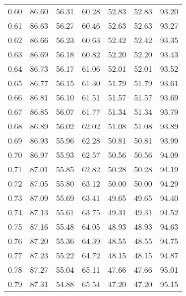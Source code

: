 \begin{tabular}{|c|c|c|c|c|c|c|}
      0.60 &     86.60 &     56.31 &      60.28 &   52.83 &      52.83 &         93.20 \\
      0.61 &     86.63 &     56.27 &      60.46 &   52.63 &      52.63 &         93.27 \\
      0.62 &     86.66 &     56.23 &      60.63 &   52.42 &      52.42 &         93.35 \\
      0.63 &     86.69 &     56.18 &      60.82 &   52.20 &      52.20 &         93.43 \\
      0.64 &     86.73 &     56.17 &      61.06 &   52.01 &      52.01 &         93.52 \\
      0.65 &     86.77 &     56.15 &      61.30 &   51.79 &      51.79 &         93.61 \\
      0.66 &     86.81 &     56.10 &      61.51 &   51.57 &      51.57 &         93.69 \\
      0.67 &     86.85 &     56.07 &      61.77 &   51.34 &      51.34 &         93.79 \\
      0.68 &     86.89 &     56.02 &      62.02 &   51.08 &      51.08 &         93.89 \\
      0.69 &     86.93 &     55.96 &      62.28 &   50.81 &      50.81 &         93.99 \\
      0.70 &     86.97 &     55.93 &      62.57 &   50.56 &      50.56 &         94.09 \\
      0.71 &     87.01 &     55.85 &      62.82 &   50.28 &      50.28 &         94.19 \\
      0.72 &     87.05 &     55.80 &      63.12 &   50.00 &      50.00 &         94.29 \\
      0.73 &     87.09 &     55.69 &      63.41 &   49.65 &      49.65 &         94.40 \\
      0.74 &     87.13 &     55.61 &      63.75 &   49.31 &      49.31 &         94.52 \\
      0.75 &     87.16 &     55.48 &      64.05 &   48.93 &      48.93 &         94.63 \\
      0.76 &     87.20 &     55.36 &      64.39 &   48.55 &      48.55 &         94.75 \\
      0.77 &     87.23 &     55.22 &      64.72 &   48.15 &      48.15 &         94.87 \\
      0.78 &     87.27 &     55.04 &      65.11 &   47.66 &      47.66 &         95.01 \\
      0.79 &     87.31 &     54.88 &      65.54 &   47.20 &      47.20 &         95.15 \\

\end{tabular}
